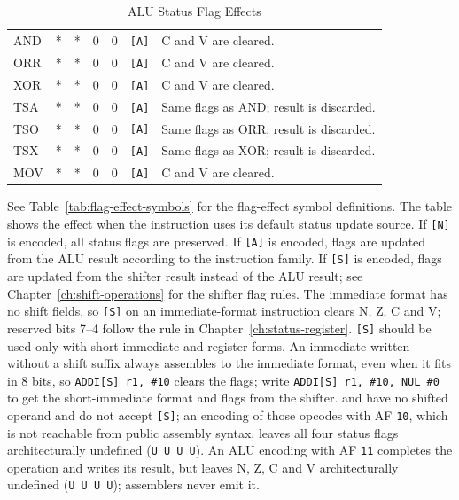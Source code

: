 \begin{table}[H]
\begin{tabular}{llllllp{5.5cm}}
		AND             & *          & *          & 0          & 0          & \texttt{[A]}        & C and V are cleared.                                               \\
		ORR             & *          & *          & 0          & 0          & \texttt{[A]}        & C and V are cleared.                                               \\
		XOR             & *          & *          & 0          & 0          & \texttt{[A]}        & C and V are cleared.                                               \\
		TSA             & *          & *          & 0          & 0          & \texttt{[A]}        & Same flags as AND; result is discarded.                            \\
		TSO             & *          & *          & 0          & 0          & \texttt{[A]}        & Same flags as ORR; result is discarded.                            \\
		TSX             & *          & *          & 0          & 0          & \texttt{[A]}        & Same flags as XOR; result is discarded.                            \\
		MOV             & *          & *          & 0          & 0          & \texttt{[A]}        & C and V are cleared.                                               \\
		\bottomrule
	\end{tabular}
	\caption{ALU Status Flag Effects}
	\label{tab:alu-status-flag-effects}
\end{table}

See Table~\ref{tab:flag-effect-symbols} for the flag-effect symbol definitions. The table shows the effect when the
instruction uses its default status update source. If \texttt{[N]} is encoded, all status flags are preserved. If
\texttt{[A]} is encoded, flags are updated from the ALU result according to the instruction family. If \texttt{[S]} is
encoded, flags are updated from the shifter result instead of the ALU result; see Chapter~\ref{ch:shift-operations} for
the shifter flag rules. The immediate format has no shift fields, so \texttt{[S]} on an immediate-format instruction
clears N, Z, C and V; reserved bits 7--4 follow the rule in Chapter~\ref{ch:status-register}. \texttt{[S]} should be
used only with short-immediate and register forms. An immediate written without a shift suffix always assembles to the
immediate format, even when it fits in 8 bits, so \texttt{ADDI[S] r1, \#10} clears the flags; write \texttt{ADDI[S] r1,
	\#10, NUL \#0} to get the short-immediate format and flags from the shifter.  and  have
no shifted operand and do not accept \texttt{[S]}; an encoding of those opcodes with AF \texttt{10}, which is not
reachable from public assembly syntax, leaves all four status flags architecturally undefined (\texttt{U U U U}). An
ALU encoding with AF \texttt{11} completes the operation and writes its result, but leaves N, Z, C and V
architecturally undefined (\texttt{U U U U}); assemblers never emit it.

